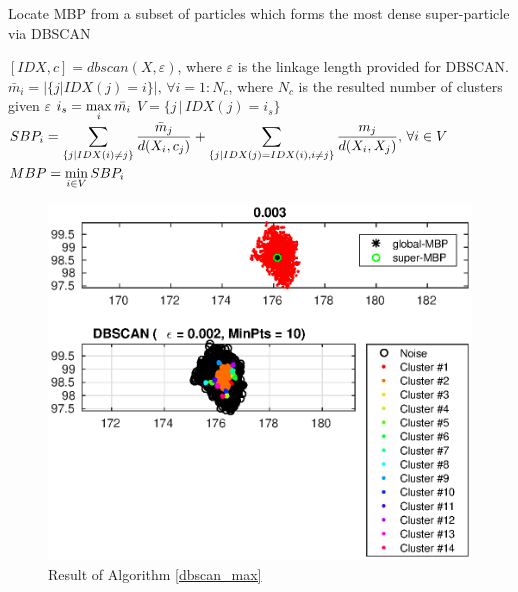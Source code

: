\documentclass[10pt]{article}
\begin{document}
 \begin{algorithm}
\caption{Locate MBP from a subset of particles which forms the most dense super-particle via DBSCAN}
\label{dbscan_max}
\begin{algorithmic}[1]
\State $[IDX,c]=dbscan(X,\varepsilon)$, where $\varepsilon$ is the linkage length provided for DBSCAN. 
\State $\bar m_i=|\{j | IDX(j)=i\}|,\,\forall i=1:N_c$, where $N_c$ is the resulted number of clusters given $\varepsilon$
\State $i_s=\displaystyle\max_i \bar{m_i}$
\State $V=\{j \,|\, IDX(j)=i_s\}$
\State $SBP_i=\displaystyle\sum_{\{j|IDX(i)\neq j\}}\frac{\bar m_j}{d(X_i,c_j)}+\displaystyle\sum_{\{j|IDX(j)=IDX(i),i\neq j\}}\frac{m_j}{d(X_i,X_j)},\, \forall i\in V$ 
\State $MBP=\displaystyle\min_{i\in V} SBP_i$
\EndProcedure
\end{algorithmic} 
 \end{algorithm}
\begin{figure}[H]
\centering
\includegraphics[scale=0.45]{p_dbscan_maxSub}%
\caption{Result of Algorithm \ref{dbscan_max}}
\label{fig:dbscan_max}
\end{figure}
\end{document}
